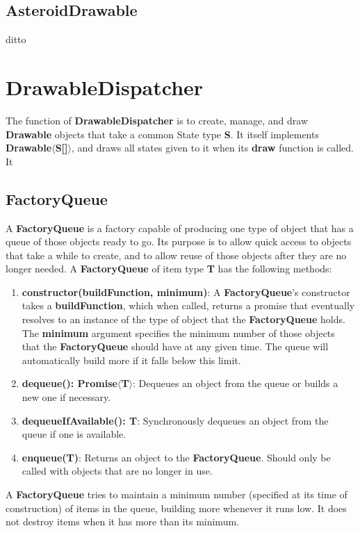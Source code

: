 \documentclass{article}
\begin{document}
\subsection{AsteroidDrawable}
ditto

\section{DrawableDispatcher}
The function of \textbf{DrawableDispatcher} is to create, manage, and draw \textbf{Drawable} objects that take a common State type \textbf{S}. It itself implements \textbf{Drawable$\langle$S[]$\rangle$}, and draws all states given to it when its \textbf{draw} function is called. It 

\subsection{FactoryQueue}
A \textbf{FactoryQueue} is a factory capable of producing one type of object that has a queue of those objects ready to go. Its purpose is to allow quick access to objects that take a while to create, and to allow reuse of those objects after they are no longer needed. A \textbf{FactoryQueue} of item type \textbf{T} has the following methods:

\begin{enumerate}
  \item \textbf{constructor(buildFunction, minimum)}: A \textbf{FactoryQueue}'s constructor takes a \textbf{buildFunction}, which when called, returns a promise that eventually resolves to an instance of the type of object that the \textbf{FactoryQueue} holds. The \textbf{minimum} argument specifies the minimum number of those objects that the \textbf{FactoryQueue} should have at any given time. The queue will automatically build more if it falls below this limit.
\item \textbf{dequeue(): Promise$\langle$T$\rangle$}: Dequeues an object from the queue or builds a new one if necessary.
\item \textbf{dequeueIfAvailable(): T}: Synchronously dequeues an object from the queue if one is available.
  \item \textbf{enqueue(T)}: Returns an object to the \textbf{FactoryQueue}. Should only be called with objects that are no longer in use.
\end{enumerate}

A \textbf{FactoryQueue} tries to maintain a minimum number (specified at its time of construction) of items in the queue, building more whenever it runs low. It does not destroy items when it has more than its minimum.
\end{document}

